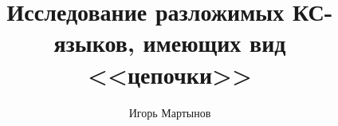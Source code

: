 \documentclass[12pt]{article}
\title{Исследование разложимых КС-языков, имеющих вид <<цепочки>>}
\author{Игорь Мартынов}
\begin{document}
\begin{comment}

\clearpage
\tableofcontents
\newpage

\section{Введение}


ВВЕДЕНИЕ ПОПРАВИТЬ (поменять цепочки на общий случай)

При передаче и хранении информации часто возникает необходимость кодирования данных таким образом, чтобы обеспечить наибольшую степень сжатия. Сжатие данных может быть достигнуто использованием статистических данных, таких как частоты появления букв в сообщениях. Если, кроме этого, учитывать структурые свойства языка сообщений, можно дополнительно увеличить эффективность сжатия.

К.~Шеннон в статье "Математическая теория связи" \cite{shennon-mts} рассматривал задачу экономного кодирования, моделируя источник сообщений автоматом с конечным числом состояний.

А. А. Марков поставил задачу экономного кодирования на множестве слов, порождаемых конечным автоматом и доказал \cite{markov-coding}, что учитывая таким образом структуру источника сообщений, можно увеличить эффективность сжатия и уменьшить вычислительную сложность алгоритма кодирования.

Ближайшим обобщением регулярных языков (языков, порождаемых конечными автоматами) являются контекстно-свободные языки. При рассмотрении таких языков удобно моделировать источник сообщений с помощью стохастической контекстно-свободной грамматики, и большую роль приобретает исследование вероятностных свойств таких грамматик.

Л. П. Жильцова изучила задачу экономного кодирования на множестве слов контекстно-свободного языка, и построила алгоритм асимптотически оптимального кодирования с полиномиальной временной сложностью для некоторых классов грамматик \cite{zhiltsova-zakonom} \cite{zhiltsova-cost}. Кроме того, она показала, что перронов корень \cite{gantmaher-matrix-theory} матрицы первых моментов \cite{sevast-processes} грамматики существенно влияет на её вероятностные свойства и эффективность кодирования.

\sloppy{
Изучение стохастических контекстно-свободных грамматик было продолжено А.~Е.~Борисовым. Он изучил грамматику с разложимой матрицей первых моментов (разложимую грамматику), с двумя классами нетерминалов \cite{borisov-zakonom}. В частности, Борисов рассмотрел случай, когда перронов корень матрицы первых моментов грамматики равен единице. По аналогии с теорией ветвящихся процессов такой случай называется критическим.
}


\end{comment}
\end{document}

